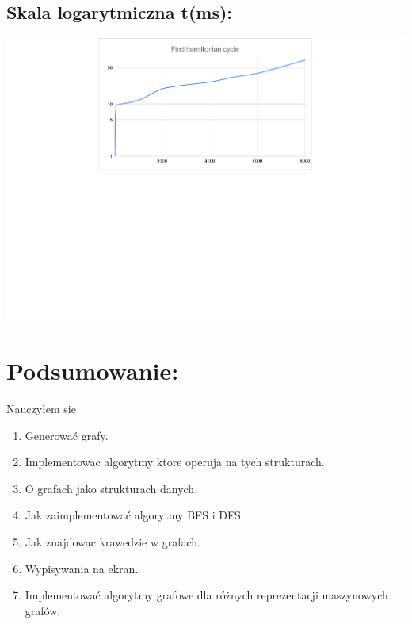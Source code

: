\documentclass[12pt]{article}
\begin{document}
\subsection{Skala logarytmiczna t(ms): }

\begin{center}

\includegraphics[width=\linewidth]{wykres_logarytmiczy_1.pdf}

\end{center}

\section{Podsumowanie: }

Nauczyłem sie

\begin{enumerate}

	\item
	      Generować grafy.
	\item
		  Implementowac algorytmy ktore operuja na tych strukturach.
	\item
		  O grafach jako strukturach danych.
	\item
		  Jak zaimplementować algorytmy BFS i DFS.
	\item
		  Jak znajdowac krawedzie w grafach.
    \item
    	      Wypisywania na ekran.
  	\item
  		  Implementować algorytmy grafowe dla różnych reprezentacji maszynowych grafów.

\end{enumerate}

\tableofcontents
\end{document}

